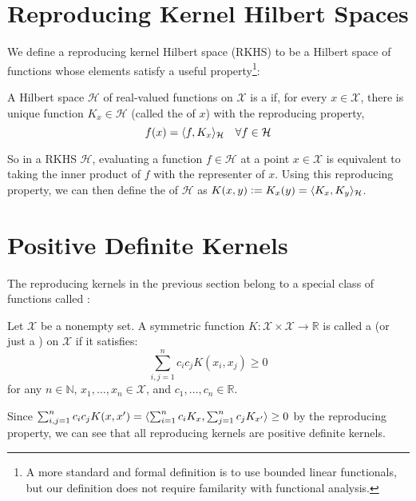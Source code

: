 \section{Reproducing Kernel Hilbert Spaces}
We define a reproducing kernel Hilbert space (RKHS) to be a Hilbert space of functions whose elements satisfy a useful property\footnote{A more standard and formal definition is to use bounded linear functionals, but our definition does not require familarity with functional analysis. \needcite}:
%
\begin{definition}
A Hilbert space $\mathcal{H}$ of real-valued functions on $\mathcal{X}$ is a  if, for every $x \in \mathcal{X}$, there is unique function $K_x \in \mathcal{H}$ (called the  of $x$) with the reproducing property,
\begin{equation}
  f(x) = \langle f, K_x\rangle_\mathcal{H} \quad \forall f \in \mathcal{H}
\end{equation}
\end{definition}

So in a RKHS $\mathcal{H}$, evaluating a function $f \in \mathcal{H}$ at a point $x \in \mathcal{X}$ is equivalent to taking the inner product of $f$ with the representer of $x$. Using this reproducing property, we can then define the  of $\mathcal{H}$ as $K(x, y) \vcentcolon= K_x(y) = \langle K_x, K_y\rangle_\mathcal{H}$.

\section{Positive Definite Kernels}
The reproducing kernels in the previous section belong to a special class of functions called :
%
\begin{definition}
Let $\mathcal{X}$ be a nonempty set. A symmetric function $K : \mathcal{X} \times \mathcal{X} \to \mathbb{R}$ is called a  (or just a ) on $\mathcal{X}$ if it satisfies:
\begin{equation}
	\sum_{i,j=1}^n c_i c_j K(x_i, x_j) \geq 0
\end{equation}
for any $n \in \mathbb{N}$, $x_1, \dots, x_n \in \mathcal{X}$, and $c_1, \dots, c_n \in \mathbb{R}$.
\end{definition}
%
Since $\sum_{i,j=1}^n c_i c_j K(x, x^\prime) = \langle\sum_{i=1}^n c_i K_x, \sum_{j=1}^n c_j K_{x^\prime}\rangle \geq 0$ by the reproducing property, we can see that all reproducing kernels are positive definite kernels.

